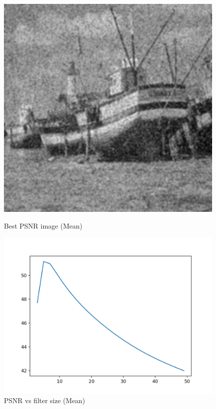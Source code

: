 \documentclass{article}
\begin{document}
    \begin{figure}[!htb]
      \includegraphics[scale=0.3]{./basic_denoising/boat/average_best_sp.png}
      \caption{Best PSNR image (Mean)}
    \endminipage \hfill
      \includegraphics[scale=.45]{./basic_denoising/boat/average_psnr_sp.png}
      \caption{PSNR vs filter size (Mean)}
    \endminipage
    \end{figure}
    
\end{document}
